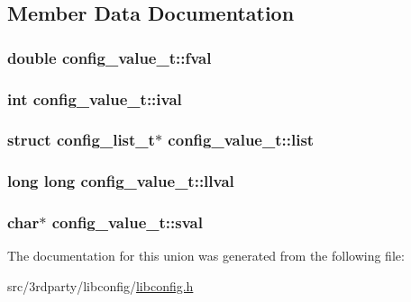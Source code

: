 \subsection{Member Data Documentation}
\hypertarget{unionconfig__value__t_a609c841d56ec29422ed61d12a90e7dfc}{
\subsubsection[{fval}]{\setlength{\rightskip}{0pt plus 5cm}double {\bf config\_\-value\_\-t::fval}}}
\label{unionconfig__value__t_a609c841d56ec29422ed61d12a90e7dfc}
\hypertarget{unionconfig__value__t_aa58090ef8528c7e35eb38c6ad23551e0}{
\subsubsection[{ival}]{\setlength{\rightskip}{0pt plus 5cm}int {\bf config\_\-value\_\-t::ival}}}
\label{unionconfig__value__t_aa58090ef8528c7e35eb38c6ad23551e0}
\hypertarget{unionconfig__value__t_a59f370b82f6ac0663825f8c90e12d63d}{
\subsubsection[{list}]{\setlength{\rightskip}{0pt plus 5cm}struct {\bf config\_\-list\_\-t}$\ast$ {\bf config\_\-value\_\-t::list}}}
\label{unionconfig__value__t_a59f370b82f6ac0663825f8c90e12d63d}
\hypertarget{unionconfig__value__t_ac375626c7fff331cf0d1e866b033f20a}{
\subsubsection[{llval}]{\setlength{\rightskip}{0pt plus 5cm}long long {\bf config\_\-value\_\-t::llval}}}
\label{unionconfig__value__t_ac375626c7fff331cf0d1e866b033f20a}
\hypertarget{unionconfig__value__t_a376d09b3da99952fcb1373b3574266ce}{
\subsubsection[{sval}]{\setlength{\rightskip}{0pt plus 5cm}char$\ast$ {\bf config\_\-value\_\-t::sval}}}
\label{unionconfig__value__t_a376d09b3da99952fcb1373b3574266ce}


The documentation for this union was generated from the following file:\begin{DoxyCompactItemize}
\item 
src/3rdparty/libconfig/\hyperlink{libconfig_8h}{libconfig.h}\end{DoxyCompactItemize}
